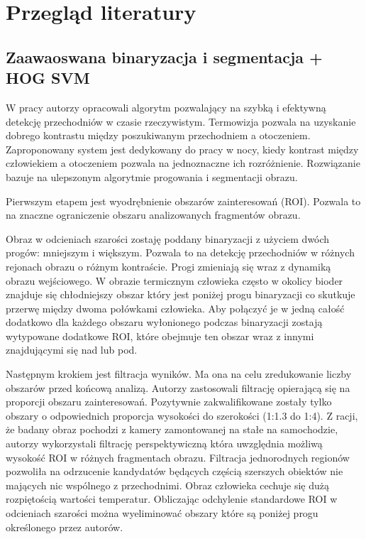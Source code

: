 \chapter{Przegląd literatury}
\label{cha:przegLiter}


\section{Zaawaoswana binaryzacja i segmentacja + HOG SVM} %
W pracy \cite{kolzpoz} autorzy opracowali algorytm pozwalający na szybką i efektywną detekcję przechodniów w czasie rzeczywistym. 
Termowizja pozwala na uzyskanie dobrego kontrastu między poszukiwanym przechodniem a otoczeniem. 
Zaproponowany system jest dedykowany do pracy w nocy, kiedy kontrast między człowiekiem a otoczeniem pozwala na jednoznaczne ich rozróżnienie. %
Rozwiązanie bazuje na ulepszonym algorytmie progowania i segmentacji obrazu. 

Pierwszym etapem jest wyodrębnienie obszarów zainteresowań (ROI).
Pozwala to na znaczne ograniczenie obszaru analizowanych fragmentów obrazu. %

Obraz w odcieniach szarości zostaję poddany binaryzacji z użyciem dwóch progów: mniejszym i większym. Pozwala to na detekcję przechodniów w różnych rejonach obrazu o różnym kontraście. 
Progi zmieniają się wraz z dynamiką obrazu wejściowego. 
W obrazie termicznym człowieka często w okolicy bioder znajduje się chłodniejszy obszar który jest poniżej progu binaryzacji co skutkuje przerwę między dwoma połówkami człowieka. Aby połączyć je w jedną całość dodatkowo dla każdego obszaru wyłonionego podczas binaryzacji zostają wytypowane dodatkowe ROI, które obejmuje ten obszar wraz z innymi znajdującymi się nad lub pod. 

Następnym krokiem jest filtracja wyników. 
Ma ona na celu zredukowanie liczby obszarów przed końcową analizą. 
Autorzy zastosowali filtrację opierającą się na proporcji obszaru zainteresowań. 
Pozytywnie zakwalifikowane zostały tylko obszary o odpowiednich proporcja wysokości do szerokości (1:1.3 do 1:4). 
Z racji, że badany obraz pochodzi z kamery zamontowanej na stałe na samochodzie, autorzy wykorzystali filtrację perspektywiczną która uwzględnia możliwą wysokość ROI w różnych fragmentach obrazu. %
Filtracja jednorodnych regionów pozwoliła na odrzucenie kandydatów będących częścią szerszych obiektów nie mających nic wspólnego z przechodnimi. Obraz człowieka cechuje się dużą rozpiętością wartości temperatur. Obliczając odchylenie standardowe ROI w odcieniach szarości można wyeliminować obszary które są poniżej progu określonego przez autorów.  %

